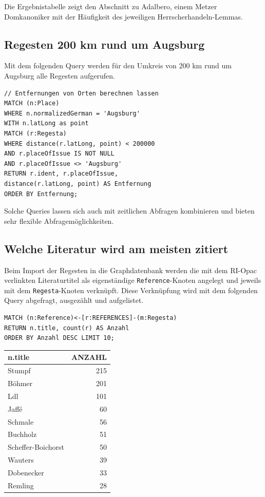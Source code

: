 \documentclass[ngerman,]{scrreprt}
\begin{document}
Die Ergebnistabelle zeigt den Abschnitt zu Adalbero, einem Metzer Domkanoniker mit der Häufigkeit des jeweiligen Herrscherhandeln-Lemmas.

\subsection{Regesten 200 km rund um Augsburg}\label{regesten-200-km-rund-um-augsburg}

Mit dem folgenden Query werden für den Umkreis von 200 km rund um Augsburg alle Regesten aufgerufen.

\begin{verbatim}
// Entfernungen von Orten berechnen lassen
MATCH (n:Place)
WHERE n.normalizedGerman = 'Augsburg'
WITH n.latLong as point
MATCH (r:Regesta)
WHERE distance(r.latLong, point) < 200000
AND r.placeOfIssue IS NOT NULL
AND r.placeOfIssue <> 'Augsburg'
RETURN r.ident, r.placeOfIssue,
distance(r.latLong, point) AS Entfernung
ORDER BY Entfernung;
\end{verbatim}

Solche Queries lassen sich auch mit zeitlichen Abfragen kombinieren und bieten sehr flexible Abfragemöglichkeiten.

\subsection{Welche Literatur wird am meisten zitiert}\label{welche-literatur-wird-am-meisten-zitiert}

Beim Import der Regesten in die Graphdatenbank werden die mit dem RI-Opac verlinkten Literaturtitel als eigenständige \texttt{Reference}-Knoten angelegt und jeweils mit dem \texttt{Regesta}-Knoten verknüpft. Diese Verknüpfung wird mit dem folgenden Query abgefragt, ausgezählt und aufgelistet.

\begin{verbatim}
MATCH (n:Reference)<-[r:REFERENCES]-(m:Regesta)
RETURN n.title, count(r) AS Anzahl
ORDER BY Anzahl DESC LIMIT 10;
\end{verbatim}

\begin{longtable}[]{@{}lr@{}}
\toprule
n.title & ANZAHL\tabularnewline
\midrule
\endhead
Stumpf & 215\tabularnewline
Böhmer & 201\tabularnewline
Ldl & 101\tabularnewline
Jaffé & 60\tabularnewline
Schmale & 56\tabularnewline
Buchholz & 51\tabularnewline
Scheffer-Boichorst & 50\tabularnewline
Wauters & 39\tabularnewline
Dobenecker & 33\tabularnewline
Remling & 28\tabularnewline
\bottomrule
\end{longtable}
\end{document}
